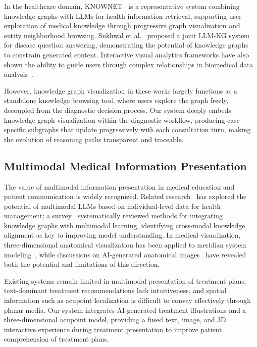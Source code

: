 \documentclass[12pt]{article}
\begin{document}
In the healthcare domain, KNOWNET~\cite{35} is a representative system combining knowledge graphs with LLMs for health information retrieval, supporting user exploration of medical knowledge through progressive graph visualization and entity neighborhood browsing. Sukhwal et al.~\cite{25} proposed a joint LLM-KG system for disease question answering, demonstrating the potential of knowledge graphs to constrain generated content. Interactive visual analytics frameworks have also shown the ability to guide users through complex relationships in biomedical data analysis~\cite{56}.

However, knowledge graph visualization in these works largely functions as a standalone knowledge browsing tool, where users explore the graph freely, decoupled from the diagnostic decision process. Our system deeply embeds knowledge graph visualization within the diagnostic workflow, producing case-specific subgraphs that update progressively with each consultation turn, making the evolution of reasoning paths transparent and traceable.

\subsection{Multimodal Medical Information Presentation}

The value of multimodal information presentation in medical education and patient communication is widely recognized. Related research~\cite{9} has explored the potential of multimodal LLMs based on individual-level data for health management; a survey~\cite{30} systematically reviewed methods for integrating knowledge graphs with multimodal learning, identifying cross-modal knowledge alignment as key to improving model understanding. In medical visualization, three-dimensional anatomical visualization has been applied to meridian system modeling~\cite{63}, while discussions on AI-generated anatomical images~\cite{47} have revealed both the potential and limitations of this direction.

Existing systems remain limited in multimodal presentation of treatment plans: text-dominant treatment recommendations lack intuitiveness, and spatial information such as acupoint localization is difficult to convey effectively through planar media. Our system integrates AI-generated treatment illustrations and a three-dimensional acupoint model, providing a fused text, image, and 3D interactive experience during treatment presentation to improve patient comprehension of treatment plans.
\end{document}
